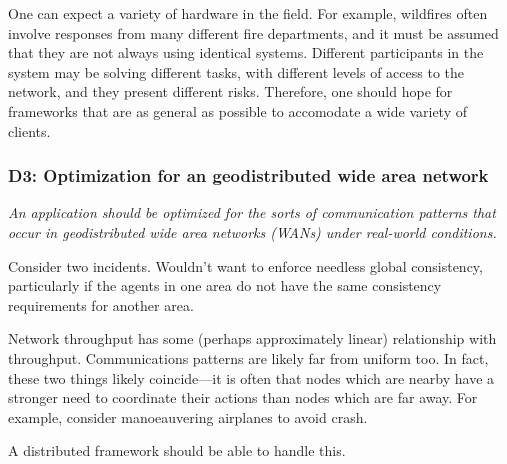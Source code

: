 One can expect a variety of hardware in the field. For example,
wildfires often involve responses from many different fire
departments, and it must be assumed that they are not always using
identical systems. Different participants in the system may be solving
different tasks, with different levels of access to the network, and
they present different risks. Therefore, one should hope for
frameworks that are as general as possible to accomodate a wide
variety of clients.

\subsubsection*{D3: Optimization for an geodistributed wide area network}

\emph{An application should be optimized for the sorts of
communication patterns that occur in geodistributed wide area networks
(WANs) under real-world conditions.}

Consider two incidents. Wouldn't want to enforce needless global
consistency, particularly if the agents in one area do not have the
same consistency requirements for another area.

Network throughput has some (perhaps approximately linear)
relationship with throughput. Communications patterns are likely far
from uniform too. In fact, these two things likely coincide---it is
often that nodes which are nearby have a stronger need to coordinate
their actions than nodes which are far away. For example, consider
manoeauvering airplanes to avoid crash.

A distributed framework should be able to handle this.
